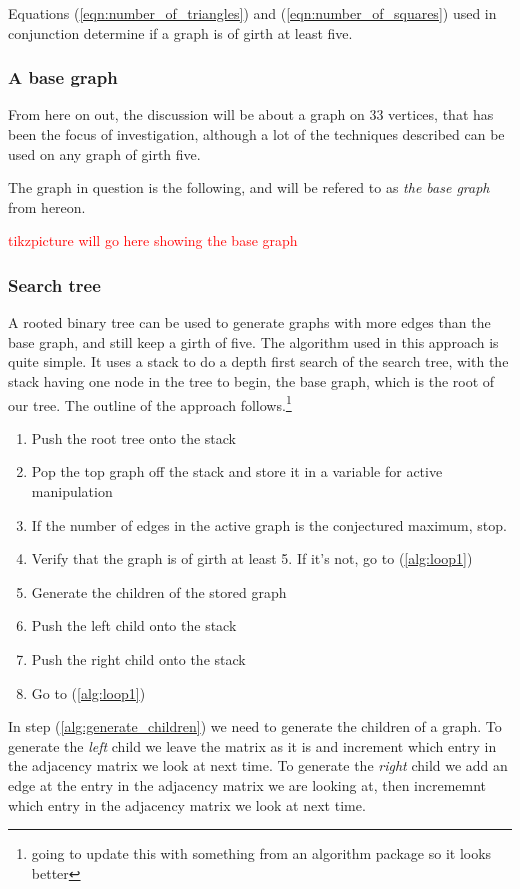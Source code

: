 \documentclass[a4paper]{article}
\begin{document}
Equations (\ref{eqn:number_of_triangles}) and (\ref{eqn:number_of_squares}) used in conjunction determine if a graph is of girth at least five. 

\subsubsection{A base graph}
From here on out, the discussion will be about a graph on 33 vertices, that has been the focus of investigation, although a lot of the techniques described can be used on any graph of girth five.

The graph in question is the following, and will be refered to as \emph{the base graph} from hereon.
\newline

\textcolor{red}{tikzpicture will go here showing the base graph}

\subsubsection{Search tree}
A rooted binary tree can be used to generate graphs with more edges than the base graph, and still keep a girth of five. The algorithm used in this approach is quite simple. It uses a stack to do a depth first search of the search tree, with the stack having one node in the tree to begin, the base graph, which is the root of our tree. The outline of the approach follows.\footnote{going to update this with something from an algorithm package so it looks better}
\begin{enumerate}
\item Push the root tree onto the stack
\item Pop the top graph off the stack and store it in a variable for active manipulation \label{alg:loop1}
\item If the number of edges in the active graph is the conjectured maximum, stop.
\item Verify that the graph is of girth at least 5. If it's not, go to (\ref{alg:loop1}) \label{alg:verify_girth}
\item Generate the children of the stored graph \label{alg:generate_children}
\item Push the left child onto the stack
\item Push the right child onto the stack
\item Go to (\ref{alg:loop1})
\end{enumerate}

In step (\ref{alg:generate_children}) we need to generate the children of a graph. To generate the \emph{left} child we leave the matrix as it is and increment which entry in the adjacency matrix we look at next time. To generate the \emph{right} child we add an edge at the entry in the adjacency matrix we are looking at, then incrememnt which entry in the adjacency matrix we look at next time.
\end{document}
